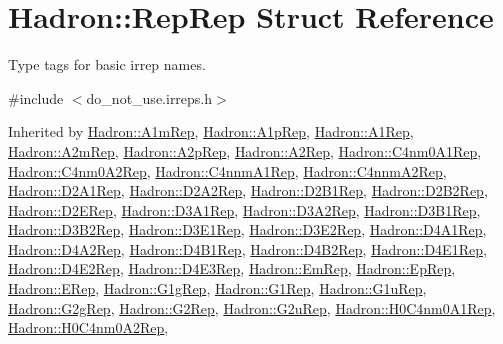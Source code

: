 \hypertarget{structHadron_1_1RepRep}{}\section{Hadron\+:\+:Rep\+Rep Struct Reference}
\label{structHadron_1_1RepRep}


Type tags for basic irrep names.  




{\ttfamily \#include $<$do\+\_\+not\+\_\+use.\+irreps.\+h$>$}



Inherited by \mbox{\hyperlink{structHadron_1_1A1mRep}{Hadron\+::\+A1m\+Rep}}, \mbox{\hyperlink{structHadron_1_1A1pRep}{Hadron\+::\+A1p\+Rep}}, \mbox{\hyperlink{structHadron_1_1A1Rep}{Hadron\+::\+A1\+Rep}}, \mbox{\hyperlink{structHadron_1_1A2mRep}{Hadron\+::\+A2m\+Rep}}, \mbox{\hyperlink{structHadron_1_1A2pRep}{Hadron\+::\+A2p\+Rep}}, \mbox{\hyperlink{structHadron_1_1A2Rep}{Hadron\+::\+A2\+Rep}}, \mbox{\hyperlink{structHadron_1_1C4nm0A1Rep}{Hadron\+::\+C4nm0\+A1\+Rep}}, \mbox{\hyperlink{structHadron_1_1C4nm0A2Rep}{Hadron\+::\+C4nm0\+A2\+Rep}}, \mbox{\hyperlink{structHadron_1_1C4nnmA1Rep}{Hadron\+::\+C4nnm\+A1\+Rep}}, \mbox{\hyperlink{structHadron_1_1C4nnmA2Rep}{Hadron\+::\+C4nnm\+A2\+Rep}}, \mbox{\hyperlink{structHadron_1_1D2A1Rep}{Hadron\+::\+D2\+A1\+Rep}}, \mbox{\hyperlink{structHadron_1_1D2A2Rep}{Hadron\+::\+D2\+A2\+Rep}}, \mbox{\hyperlink{structHadron_1_1D2B1Rep}{Hadron\+::\+D2\+B1\+Rep}}, \mbox{\hyperlink{structHadron_1_1D2B2Rep}{Hadron\+::\+D2\+B2\+Rep}}, \mbox{\hyperlink{structHadron_1_1D2ERep}{Hadron\+::\+D2\+E\+Rep}}, \mbox{\hyperlink{structHadron_1_1D3A1Rep}{Hadron\+::\+D3\+A1\+Rep}}, \mbox{\hyperlink{structHadron_1_1D3A2Rep}{Hadron\+::\+D3\+A2\+Rep}}, \mbox{\hyperlink{structHadron_1_1D3B1Rep}{Hadron\+::\+D3\+B1\+Rep}}, \mbox{\hyperlink{structHadron_1_1D3B2Rep}{Hadron\+::\+D3\+B2\+Rep}}, \mbox{\hyperlink{structHadron_1_1D3E1Rep}{Hadron\+::\+D3\+E1\+Rep}}, \mbox{\hyperlink{structHadron_1_1D3E2Rep}{Hadron\+::\+D3\+E2\+Rep}}, \mbox{\hyperlink{structHadron_1_1D4A1Rep}{Hadron\+::\+D4\+A1\+Rep}}, \mbox{\hyperlink{structHadron_1_1D4A2Rep}{Hadron\+::\+D4\+A2\+Rep}}, \mbox{\hyperlink{structHadron_1_1D4B1Rep}{Hadron\+::\+D4\+B1\+Rep}}, \mbox{\hyperlink{structHadron_1_1D4B2Rep}{Hadron\+::\+D4\+B2\+Rep}}, \mbox{\hyperlink{structHadron_1_1D4E1Rep}{Hadron\+::\+D4\+E1\+Rep}}, \mbox{\hyperlink{structHadron_1_1D4E2Rep}{Hadron\+::\+D4\+E2\+Rep}}, \mbox{\hyperlink{structHadron_1_1D4E3Rep}{Hadron\+::\+D4\+E3\+Rep}}, \mbox{\hyperlink{structHadron_1_1EmRep}{Hadron\+::\+Em\+Rep}}, \mbox{\hyperlink{structHadron_1_1EpRep}{Hadron\+::\+Ep\+Rep}}, \mbox{\hyperlink{structHadron_1_1ERep}{Hadron\+::\+E\+Rep}}, \mbox{\hyperlink{structHadron_1_1G1gRep}{Hadron\+::\+G1g\+Rep}}, \mbox{\hyperlink{structHadron_1_1G1Rep}{Hadron\+::\+G1\+Rep}}, \mbox{\hyperlink{structHadron_1_1G1uRep}{Hadron\+::\+G1u\+Rep}}, \mbox{\hyperlink{structHadron_1_1G2gRep}{Hadron\+::\+G2g\+Rep}}, \mbox{\hyperlink{structHadron_1_1G2Rep}{Hadron\+::\+G2\+Rep}}, \mbox{\hyperlink{structHadron_1_1G2uRep}{Hadron\+::\+G2u\+Rep}}, \mbox{\hyperlink{structHadron_1_1H0C4nm0A1Rep}{Hadron\+::\+H0\+C4nm0\+A1\+Rep}}, \mbox{\hyperlink{structHadron_1_1H0C4nm0A2Rep}{Hadron\+::\+H0\+C4nm0\+A2\+Rep}}, 